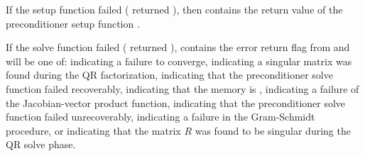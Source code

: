 {
  If the {\cvspgmr} setup function failed ( returned
  ), then  contains the return value
  of the preconditioner setup function .

  If the {\cvspgmr} solve function failed ( returned
  ),  contains the error return flag
  from  and will be one of: 
  indicating a failure to converge, 
  indicating a singular matrix was found during the QR factorization,
   indicating that the preconditioner
  solve function  failed recoverably, 
  indicating that the {\spgmr} memory is ,
   indicating a failure of the Jacobian-vector
  product function,  indicating that
  the preconditioner solve function  failed unrecoverably,
   indicating a failure in the Gram-Schmidt
  procedure, or  indicating that the matrix $R$
  was found to be singular during the QR solve phase.
}


